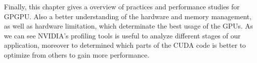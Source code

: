 \vspace{3.2em}

Finally, this chapter gives a overview of practices and performance studies for GPGPU. Also a better understanding of the hardware and memory management, as well as hardware limitation, which determinate the best usage of the GPUs. As we can see NVIDIA's profiling tools is useful to analyze different stages of our application, moreover to determined which parts of the CUDA code is better to optimize from others to gain more performance.


